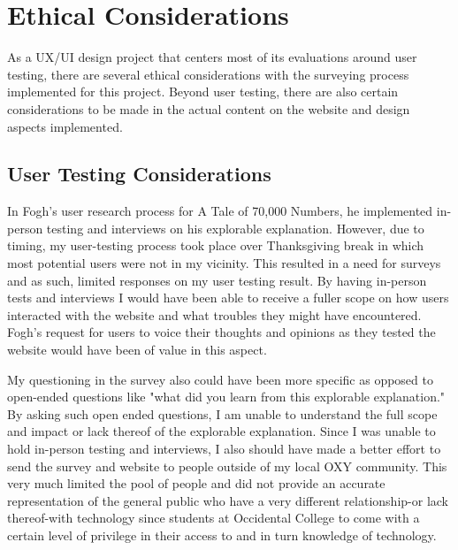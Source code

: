 \documentclass[10pt,twocolumn]{article}
\begin{document}
\section{Ethical Considerations}
As a UX/UI design project that centers most of its evaluations around user testing, there are several ethical considerations with the surveying process implemented for this project. Beyond user testing, there are also certain considerations to be made in the actual content on the website and design aspects implemented. 
\subsection{User Testing Considerations}
In Fogh's user research process for A Tale of 70,000 Numbers, he implemented in-person testing and interviews on his explorable explanation. \cite{ExplorableExplanation} However, due to timing, my user-testing process took place over Thanksgiving break in which most potential users were not in my vicinity. This resulted in a need for surveys and as such, limited responses on my user testing result. By having in-person tests and interviews I would have been able to receive a fuller scope on how users interacted with the website and what troubles they might have encountered. Fogh's request for users to voice their thoughts and opinions as they tested the website would have been of value in this aspect. 


My questioning in the survey also could have been more specific as opposed to open-ended questions like "what did you learn from this explorable explanation." By asking such open ended questions, I am unable to understand the full scope and impact or lack thereof of the explorable explanation. Since I was unable to hold in-person testing and interviews, I also should have made a better effort to send the survey and website to people outside of my local OXY community. This very much limited the pool of people and did not provide an accurate representation of the general public who have a very different relationship-or lack thereof-with technology since students at Occidental College to come with a certain level of privilege in their access to and in turn knowledge of technology.
\end{document}
